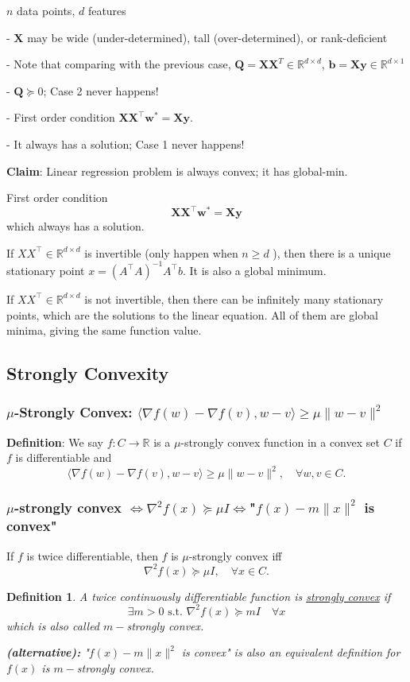 \documentclass[11pt,a4paper]{article}
\newtheorem{definition}{Definition}
\begin{document}
$n$ data points, $d$ features

- $\mathbf{X}$ may be wide (under-determined), tall (over-determined), or rank-deficient

- Note that comparing with the previous case, $\mathbf{Q}=\mathbf{X X}^{T} \in \mathbb{R}^{d \times d}$, $\mathbf{b}=\mathbf{X} \mathbf{y} \in \mathbb{R}^{d \times 1}$

- $\mathbf{Q} \succeq 0$; Case 2 never happens!

- First order condition $\mathbf{X X}^{\top} \mathbf{w}^{*}=\mathbf{X} \mathbf{y}$.

\quad - It always has a solution; Case 1 never happens!

\textbf{Claim}: Linear regression problem is always convex; it has global-min.

First order condition
$$
\mathbf{X X}^{\top} \mathbf{w}^{*}=\mathbf{X} \mathbf{y}
$$
which always has a solution.

If $X X^{\top} \in \mathbb{R}^{d \times d}$ is invertible (only happen when $n \geq d$ ), then there is a unique stationary point $x=\left(A^{\top} A\right)^{-1} A^{\top} b$. It is also a global minimum.

If $X X^{\top} \in \mathbb{R}^{d \times d}$ is not invertible, then there can be infinitely many stationary points, which are the solutions to the linear equation.
All of them are global minima, giving the same function value.

\subsection{Strongly Convexity}
\subsubsection{$\mu$-Strongly Convex: $
\langle\nabla f(w)-\nabla f(v), w-v\rangle \geq \mu\|w-v\|^{2}$}
\textbf{Definition}: We say $f: C \rightarrow \mathbb{R}$ is a $\mu$-strongly convex function in a convex set $C$ if $f$ is differentiable and
$$
\langle\nabla f(w)-\nabla f(v), w-v\rangle \geq \mu\|w-v\|^{2}, \quad \forall w, v \in C .
$$
\subsubsection{$\mu$-strongly convex $\Leftrightarrow \nabla^{2} f(x) \succeq \mu I\Leftrightarrow$"$f(x)-m\|x\|^2$ is convex"}
If $f$ is twice differentiable, then $f$ is $\mu$-strongly convex iff
$$
\nabla^{2} f(x) \succeq \mu I, \quad \forall x \in C .
$$
\begin{definition}
    A twice continuously differentiable function is \underline{strongly convex} if $$\exists m>0\text{ s.t. }\nabla^2 f(x)\succeq mI\quad \forall x$$
    which is also called $m-$strongly convex.

    \textbf{(alternative):} "$f(x)-m\|x\|^2$ is convex" is also an equivalent definition for $f(x)$ is $m-$strongly convex.
\end{definition}
\end{document}
